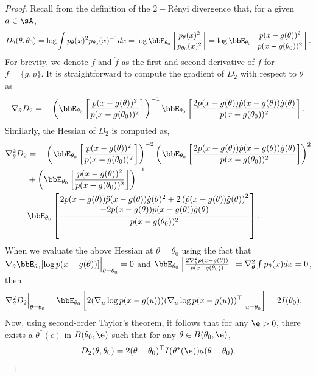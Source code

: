 \documentclass[11pt]{article}
\begin{document}
 \begin{proof}
     Recall from the definition of the $2-$R\'enyi divergence that, for a given $a \in \sA$,
     \begin{align}
         { D_2(\theta,\theta_0)} = \log   \int p_{\theta}(x)^2p_{\theta_0}(x)^{-1}dx   = \log \bbE_{\theta_0} \left[ \frac{p_{\theta}(x)^2}{p_{\theta_0}(x)^2} \right] = \log \bbE_{\theta_0} \left[ \frac{p(x-g(\theta))^2}{p(x-g(\theta_0))^2} \right].
     \end{align}
     For brevity, we denote $\dot{f}$ and $\ddot{f}$ as the first and second derivative of $f$ for $f=\{g,p\}$. It is straightforward to compute the gradient of $D_2$ with respect to $\theta$ as
     \begin{align}
         \nabla_{\theta} D_2 = - \left( \bbE_{\theta_0} \left[ \frac{p(x-g(\theta))^2}{p(x-g(\theta_0))^2} \right]\right)^{-1}   \bbE_{\theta_0} \left[  \frac{2 p(x-g(\theta))\dot{p}(x-g(\theta))\dot{g}(\theta)  }{p(x-g(\theta_0))^2}  \right]. 
     \end{align}
     Similarly, the Hessian of $D_2$ is computed as, 
     \begin{align}
         \nonumber
         \nabla_{\theta}^2 D_2 &=  -\left( \bbE_{\theta_0} \left[ \frac{p(x-g(\theta))^2}{p(x-g(\theta_0))^2} \right]\right)^{-2}   \left(\bbE_{\theta_0} \left[  \frac{2 p(x-g(\theta))\dot{p}(x-g(\theta))\dot{g}(\theta)  }{p(x-g(\theta_0))^2}  \right]\right)^2 
         \\
         \nonumber
         &+ \left( \bbE_{\theta_0} \left[ \frac{p(x-g(\theta))^2}{p(x-g(\theta_0))^2} \right] \right)^{-1} 
         \\
         &  \bbE_{\theta_0} \left[ \frac{
         \begin{matrix}
         2 p(x-g(\theta))\ddot{p}(x-g(\theta)) \dot{g}(\theta)^2 + 2 \left( \dot{p}(x-g(\theta)) \dot{g}(\theta) \right)^2 \\ 
         - 2 p(x-g(\theta))\dot{p}(x-g(\theta))\ddot{g}(\theta) 
         \end{matrix}}{p(x-g(\theta_0))^2}  \right].
     \end{align}
      When we evaluate the above Hessian at $\theta=\theta_0$ using the fact that $\nabla_{\theta}\bbE_{\theta_0}[\log p(x-g(\theta))] \Big|_{\theta=\theta_0} = 0$ and $\bbE_{\theta_0} \left[ \frac{2  \nabla_{\theta}^2 {p}(x-g(\theta))  }{p(x-g(\theta_0))} \right] = \nabla_{\theta}^2 \int p_{\theta}(x)dx = 0$, then 
     \begin{align}
         \nabla_{\theta}^2 D_2 \Big| _{\theta= \theta_0} &=   \bbE_{\theta_0} \left[  2  ( \nabla_{u} \log p(x-g(u)) ) ( \nabla_{u}\log p(x-g(u)) )^\top \Big |_{u = \theta_0}   \right] 
          =     2 I(\theta_0).
     \end{align}
     Now, using second-order Taylor's theorem, it follows that for any $\e>0$, there exists a $\theta^*(\epsilon)$ in $B(\theta_0,\e)$ such that for any $\theta\in B(\theta_0,\e)$,
     \begin{align}
         D_2(\theta,\theta_0) =  2 (\theta-\theta_0)^\top  I(\theta^*(\e))a(\theta-\theta_0).
     \end{align}
 \end{proof}
\end{document}
